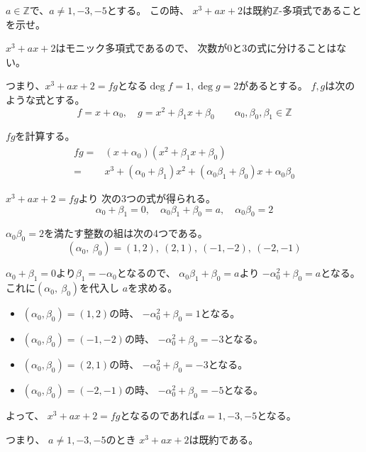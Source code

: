 \documentclass[12pt,b5paper]{ltjsarticle}
\begin{document}
\hrulefill

$a\in\mathbb{Z}$で、$a\ne 1, -3, -5$とする。
この時、
$x^3+ax+2$は既約$\mathbb{Z}$-多項式であることを示せ。

\dotfill

$x^3+ax+2$はモニック多項式であるので、
次数が0と3の式に分けることはない。

つまり、$x^3+ax+2=fg$となる$\deg{f}=1,\deg{g}=2$があるとする。
$f,g$は次のような式とする。
\begin{equation}
 f=x+\alpha_0
  ,\quad
 g=x^2+\beta_1 x + \beta_0
 \qquad
 \alpha_0,\beta_0,\beta_1 \in\mathbb{Z}
\end{equation}


$fg$を計算する。
\begin{align}
 fg=&(x+\alpha_0)(x^2+\beta_1 x + \beta_0)\\
  =& x^3 + (\alpha_0+\beta_1)x^2
 + (\alpha_0\beta_1 + \beta_0)x + \alpha_0\beta_0
\end{align}

$x^3+ax+2=fg$より
次の3つの式が得られる。
\begin{equation}
 \alpha_0+\beta_1=0
  ,\quad
 \alpha_0\beta_1 + \beta_0=a
  ,\quad
 \alpha_0\beta_0=2
\end{equation}

$\alpha_0\beta_0=2$を満たす整数の組は次の4つである。
\begin{equation}
 (\alpha_0,\ \beta_0)=
  (1,2),\ (2,1),\ (-1,-2),\ (-2,-1)
\end{equation}

$\alpha_0+\beta_1=0$より$\beta_1=-\alpha_0$となるので、
$\alpha_0\beta_1 + \beta_0=a$より
$-\alpha_0^2 + \beta_0=a$となる。
これに$(\alpha_0,\ \beta_0)$を代入し
$a$を求める。

\begin{itemize}
 \item
      $(\alpha_0,\beta_0)=(1,2)$の時、
      $-\alpha_0^2 + \beta_0=1$となる。

 \item
      $(\alpha_0,\beta_0)=(-1,-2)$の時、
      $-\alpha_0^2 + \beta_0=-3$となる。

 \item
      $(\alpha_0,\beta_0)=(2,1)$の時、
      $-\alpha_0^2 + \beta_0=-3$となる。

 \item
      $(\alpha_0,\beta_0)=(-2,-1)$の時、
      $-\alpha_0^2 + \beta_0=-5$となる。

\end{itemize}

よって、
$x^3+ax+2=fg$となるのであれば$a=1,-3,-5$となる。

つまり、
$a\ne1,-3,-5$のとき
$x^3+ax+2$は既約である。

\hrulefill
\end{document}
